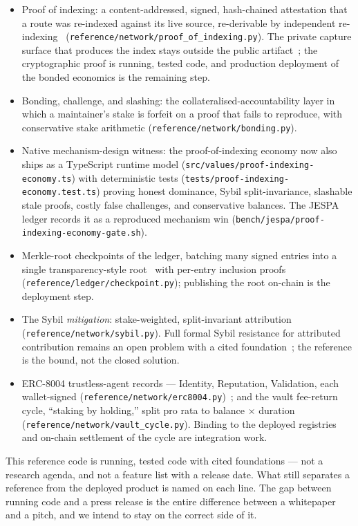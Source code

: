 \documentclass[11pt]{article}
\begin{document}
\begin{itemize}[leftmargin=1.4em]
\item Proof of indexing: a content-addressed, signed, hash-chained
attestation that a route was re-indexed against its live source, re-derivable by
independent re-indexing~\cite{thegraph,filecoin2017}
(\texttt{reference/network/\allowbreak proof\_of\_indexing.py}). The private capture
surface that produces the index stays outside the public artifact~\cite{ossnotice}; the
cryptographic proof is running, tested code, and production deployment of the bonded
economics is the remaining step.
\item Bonding, challenge, and slashing: the collateralised-accountability
layer in which a maintainer's stake is forfeit on a proof that fails to reproduce,
with conservative stake arithmetic (\texttt{reference/network/bonding.py}).
\item Native mechanism-design witness: the proof-of-indexing economy now also
ships as a TypeScript runtime model
(\texttt{src/values/proof-indexing-economy.ts}) with deterministic tests
(\texttt{tests/proof-indexing-economy.test.ts}) proving honest dominance,
Sybil split-invariance, slashable stale proofs, costly false challenges, and
conservative balances. The JESPA ledger records it as a reproduced mechanism win
(\texttt{bench/jespa/proof-indexing-economy-gate.sh}).
\item Merkle-root checkpoints of the ledger, batching many signed entries
into a single transparency-style root~\cite{rfc6962} with per-entry inclusion proofs
(\texttt{reference/ledger/checkpoint.py}); publishing the root on-chain is the
deployment step.
\item The Sybil \emph{mitigation}: stake-weighted, split-invariant
attribution (\texttt{reference/network/sybil.py}). Full formal Sybil resistance for
attributed contribution remains an open problem with a cited
foundation~\cite{sybil}; the reference is the bound, not the closed solution.
\item ERC-8004 trustless-agent records --- Identity, Reputation,
Validation, each wallet-signed (\texttt{reference/network/erc8004.py})~\cite{erc8004};
and the vault fee-return cycle, ``staking by holding,'' split pro rata to
balance $\times$ duration (\texttt{reference/network/vault\_cycle.py}). Binding to
the deployed registries and on-chain settlement of the cycle are integration work.
\end{itemize}
This reference code is running, tested code with cited foundations --- not a
research agenda, and not a feature list with a release date. What still separates a
reference from the deployed product is named on each line. The gap between running
code and a press release is the entire difference between a whitepaper and a pitch,
and we intend to stay on the correct side of it.
\end{document}
